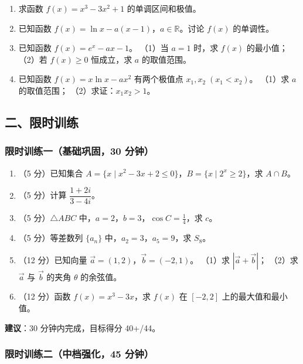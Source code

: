 \begin{enumerate}
  \item[★] 求函数 $f(x)=x^3-3x^2+1$ 的单调区间和极值。
  \vspace{1.5cm}

  \item[★★] 已知函数 $f(x)=\ln x - a(x-1)$，$a\in\mathbb{R}$。讨论 $f(x)$ 的单调性。
  \vspace{2cm}

  \item[★★] 已知函数 $f(x)=e^x - ax - 1$。
  （1）当 $a=1$ 时，求 $f(x)$ 的最小值；
  （2）若 $f(x) \ge 0$ 恒成立，求 $a$ 的取值范围。
  \vspace{2cm}

  \item[★★★] 已知函数 $f(x)=x\ln x - ax^2$ 有两个极值点 $x_1,x_2\;(x_1<x_2)$。
  （1）求 $a$ 的取值范围；
  （2）求证：$x_1x_2 > 1$。
  \vspace{2.5cm}
\end{enumerate}

\subsection{二、限时训练}

\subsubsection{限时训练一（基础巩固，30 分钟）}

\begin{enumerate}
  \item（5 分）已知集合 $A=\{x\mid x^2-3x+2\le 0\}$，$B=\{x\mid 2^x\ge 2\}$，求 $A\cap B$。
  \item（5 分）计算 $\dfrac{1+2i}{3-4i}$。
  \item（5 分）$\triangle ABC$ 中，$a=2$，$b=3$，$\cos C = \frac14$，求 $c$。
  \item（5 分）等差数列 $\{a_n\}$ 中，$a_2=3$，$a_5=9$，求 $S_8$。
  \item（12 分）已知向量 $\vec{a}=(1,2)$，$\vec{b}=(-2,1)$。
  （1）求 $|\vec{a}+\vec{b}|$；
  （2）求 $\vec{a}$ 与 $\vec{b}$ 的夹角 $\theta$ 的余弦值。
  \item（12 分）函数 $f(x)=x^3-3x$，求 $f(x)$ 在 $[-2,2]$ 上的最大值和最小值。
\end{enumerate}

\textbf{建议}：30 分钟内完成，目标得分 40+/44。

\subsubsection{限时训练二（中档强化，45 分钟）}

